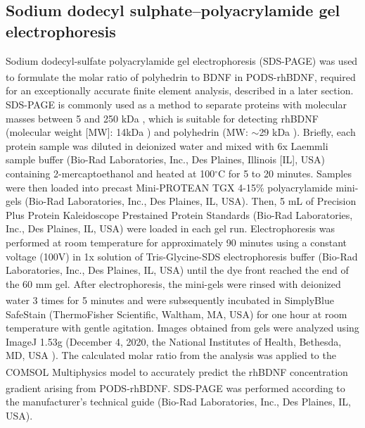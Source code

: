 \documentclass[review]{elsarticle}
\begin{document}
\subsection{Sodium dodecyl sulphate–polyacrylamide gel electrophoresis} 
Sodium dodecyl-sulfate polyacrylamide gel electrophoresis (SDS-PAGE) was used to formulate the molar ratio of polyhedrin to BDNF in PODS\textsuperscript{\textregistered}-rhBDNF, required for an exceptionally accurate finite element analysis, described in a later section. SDS-PAGE is commonly used as a method to separate proteins with molecular masses between 5 and 250 kDa  \cite{Laemmli1970}, which is suitable for detecting rhBDNF (molecular weight [MW]: 14kDa \cite {Mandel2009}) and polyhedrin (MW: $\sim$29 kDa \cite{Guo2017}).  Briefly, each protein sample was diluted in deionized water and mixed with 6x Laemmli sample buffer (Bio-Rad Laboratories, Inc., Des Plaines, Illinois [IL], USA) containing 2-mercaptoethanol and heated at 100$^\circ$C for 5 to 20 minutes. Samples were then loaded into precast Mini-PROTEAN TGX 4-15\% polyacrylamide mini-gels (Bio-Rad Laboratories, Inc., Des Plaines, IL, USA). Then, 5 mL of Precision Plus Protein Kaleidoscope Prestained Protein Standards (Bio-Rad Laboratories, Inc., Des Plaines, IL, USA) were loaded in each gel run. Electrophoresis was performed at room temperature for approximately 90 minutes using a constant voltage (100V) in 1x solution of Tris-Glycine-SDS electrophoresis buffer (Bio-Rad Laboratories, Inc., Des Plaines, IL, USA) until the dye front reached the end of the 60 mm gel. After electrophoresis, the mini-gels were rinsed with deionized water 3 times for 5 minutes and were subsequently incubated in SimplyBlue\textsuperscript{\texttrademark} SafeStain (ThermoFisher Scientific, Waltham, MA, USA) for one hour at room temperature with gentle agitation. Images obtained from gels were analyzed using ImageJ 1.53g (December 4, 2020, the National Institutes of Health, Bethesda, MD, USA \cite{Schneider2012}). The calculated molar ratio from the analysis was applied to the COMSOL\textsuperscript{\textregistered} Multiphysics model to accurately predict the rhBDNF concentration gradient arising from PODS\textsuperscript{\textregistered}-rhBDNF. SDS-PAGE was performed according to the manufacturer's technical guide (Bio-Rad Laboratories, Inc., Des Plaines, IL, USA). 
\end{document}
